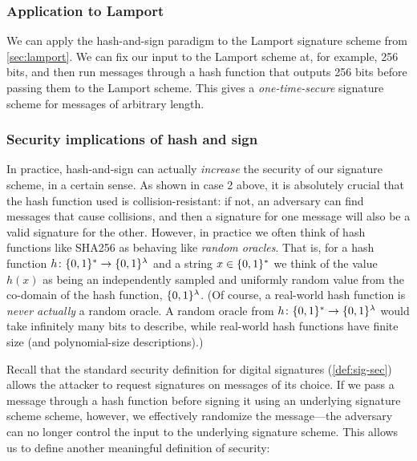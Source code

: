 \subsubsection{Application to Lamport}
We can apply the hash-and-sign paradigm to the Lamport signature scheme from \cref{sec:lamport}.
We can fix our input to the Lamport scheme at, for example, 256 bits, and then run messages through a hash function that outputs 256 bits before passing them to the Lamport scheme.
This gives a \emph{one-time-secure} signature scheme for messages of arbitrary length.

\subsubsection{Security implications of hash and sign}

In practice, hash-and-sign can actually \emph{increase} the security of our signature scheme, in a certain sense. As shown in case 2 above, it is absolutely crucial that the hash function used is collision-resistant: if not, an adversary can find messages that cause collisions, and then a signature for one message will also be a valid signature for the other. However, in practice we often think of hash functions like SHA256 as behaving like \emph{random oracles}.
That is, for a hash function $h \colon \{0,1\}^* \to \{0,1\}^\lambda$ and a string $x \in \{0,1\}^*$ we think of the value $h(x)$ as being an independently
sampled and uniformly random value from the co-domain of the hash function, $\{0,1\}^\lambda$.
(Of course, a real-world hash function is \emph{never actually} a random
oracle. A random oracle from $h \colon \{0,1\}^* \to \{0,1\}^\lambda$ would take
infinitely many bits to describe, while real-world hash functions have
finite size (and polynomial-size descriptions).)

Recall that the standard security definition for
digital signatures (\cref{def:sig-sec}) allows
the attacker to request signatures on messages
of its choice.
If we pass a message through a hash function before signing
it using an underlying signature scheme scheme, however, 
we effectively randomize the message---the adversary can no longer control the
input to the underlying signature scheme. This allows us to define
another meaningful definition of security:

